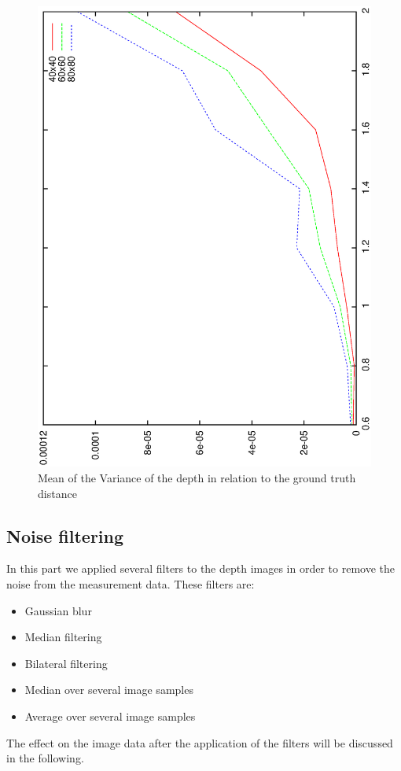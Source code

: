 \documentclass[DIV12,a4paper]{scrartcl}
\begin{document}
\begin{figure}[!htbp]
  \centering
  \includegraphics[height=0.8\textwidth,angle=270]{figures/variances.eps}
  \caption{Mean of the Variance of the depth in relation to the ground truth distance}
  \label{fig:variance}
\end{figure}





\subsection{Noise filtering}
\label{sec:filtering}
In this part we applied several filters to the depth images in order to remove the noise from the measurement data. These filters are:
\begin{itemize}
\item Gaussian blur
\item Median filtering
\item Bilateral filtering
\item Median over several image samples
\item Average over several image samples
\end{itemize}
The effect on the image data after the application of the filters will be discussed in the following.
\end{document}
